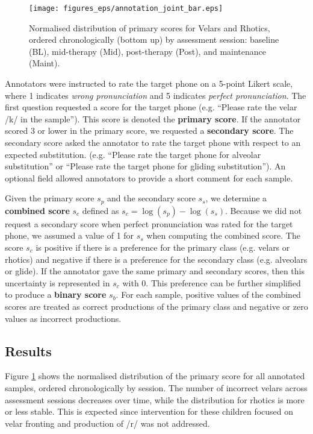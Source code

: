 \begin{figure}
\texttt{[image: figures\_eps/annotation\_joint\_bar.eps]}
\caption{\label{fig:annotation-bar-chart} Normalised distribution of primary scores for Velars and Rhotics, ordered chronologically (bottom up) by assessment session: baseline (BL), mid-therapy (Mid), post-therapy (Post), and maintenance (Maint).}
\end{figure}


Annotators were instructed to rate the target phone on a 5-point Likert scale,
where 1 indicates \emph{wrong pronunciation} and 5 indicates \emph{perfect pronunciation}.
The first question requested a score for the target phone (e.g. \enquote{Please rate the velar /k/ in the sample}).
This score is denoted the \textbf{primary score}.
If the annotator scored 3 or lower in the primary score, we requested a \textbf{secondary score}.
The secondary score asked the annotator to rate the target phone with respect to an expected substitution.
(e.g. \enquote{Please rate the target phone for alveolar substitution} or \enquote{Please rate the target phone for gliding substitution}).
An optional field allowed annotators to provide a short comment for each sample.

Given the primary score $s_p$ and the secondary score $s_s$, we determine a \textbf{combined score} $s_c$ defined as $s_c = \log(s_p)-\log(s_s)$.
Because we did not request a secondary score when perfect pronunciation was rated for the target phone, we assumed a value of 1 for $s_s$ when computing the combined score.
The score $s_c$ is positive if there is a preference for the primary class (e.g. velars or rhotics) and negative if there is a preference for the secondary class (e.g. alveolars or glide).
If the annotator gave the same primary and secondary scores, then this uncertainty is represented in $s_c$ with 0.
This preference can be further simplified to produce a \textbf{binary score} $s_b$.
For each sample, positive values of the combined scores are treated as correct productions of the primary class and negative or zero values as incorrect productions.


\subsection{Results}
\label{subsec:annotation_results}

Figure \ref{fig:annotation-bar-chart} shows the normalised distribution of the primary score for all annotated samples, ordered chronologically by session.
The number of incorrect velars across assessment sessions decreases over time, while the distribution for rhotics is more or less stable.
This is expected since intervention for these children focused on velar fronting and production of /r/ was not addressed.

